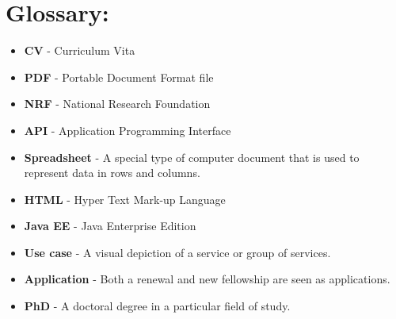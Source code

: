 \documentclass[12pt]{article}
\begin{document}
\newpage
\section{Glossary:} %
\vspace{0.2in}

\begin{itemize}


\item \textbf{CV} - Curriculum Vita
\item \textbf{PDF} - Portable Document Format file
\item \textbf{NRF} - National Research Foundation
\item \textbf{API} - Application Programming Interface
\item \textbf{Spreadsheet} - A special type of computer document that is used to represent data in rows and columns. 
\item \textbf{HTML} - Hyper Text Mark-up Language
\item \textbf{Java EE} - Java Enterprise Edition
\item \textbf{Use case} - A visual depiction of a service or group of services.
\item \textbf{Application} - Both a renewal and new fellowship are seen as applications.
\item \textbf{PhD} - A doctoral degree in a particular field of study. 


\end{itemize}	


\vspace{0.5in}
\end{document}
